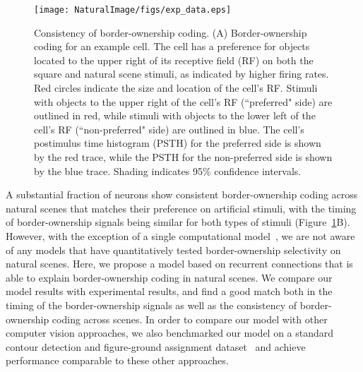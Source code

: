 \begin{figure}[t!]
\centering
\texttt{[image: NaturalImage/figs/exp\_data.eps]}
\makeatletter
\let\@currsize\normalsize
\caption[Consistency of border-ownership coding across square and natural scene stimuli]{Consistency of border-ownership coding. (A) Border-ownership coding for an example cell. The cell has a preference for objects located to the upper right of its receptive field (RF) on both the square and natural scene stimuli, as indicated by higher firing rates. Red circles indicate the size and location of the cell's RF. Stimuli with objects to the upper right of the cell's RF (``preferred" side) are outlined in red, while stimuli with objects to the lower left of the cell's RF (``non-preferred" side) are outlined in blue. The cell's postimulus time histogram (PSTH) for the preferred side is shown by the red trace, while the PSTH for the non-preferred side is shown by the blue trace. Shading indicates 95\% confidence intervals.}
\label{Fig:experiments}
\end{figure}

A substantial fraction of neurons show consistent border-ownership coding across natural scenes that matches their preference on artificial stimuli, with the timing of border-ownership signals being similar for both types of stimuli (Figure~\ref{Fig:experiments}B). However, with the exception of a single computational model~\citep{Sakai_etal12}, we are not aware of any models that have quantitatively tested border-ownership selectivity on natural scenes. Here, we propose a model based on recurrent connections that is able to explain border-ownership coding in natural scenes. We compare our model results with experimental results, and find a good match both in the timing of the border-ownership signals as well as the consistency of border-ownership coding across scenes. In order to compare our model with other computer vision approaches, we also benchmarked our model on a standard contour detection and figure-ground assignment dataset~\citep{Martin_etal01} and achieve performance comparable to these other approaches.

